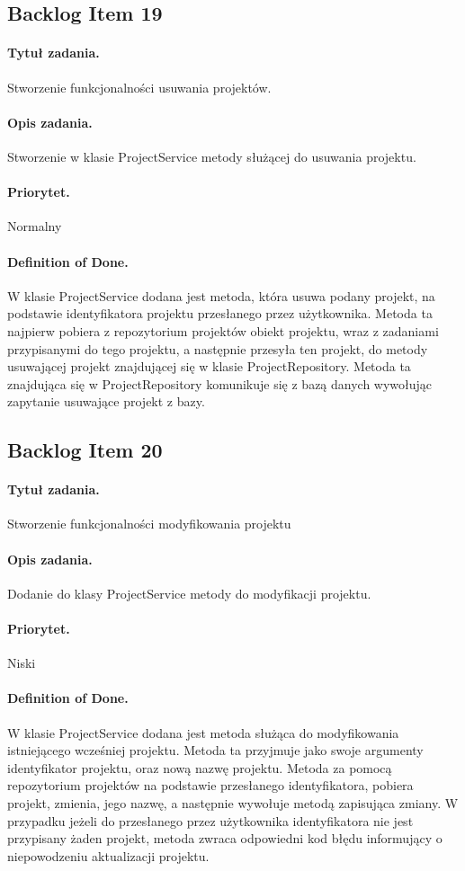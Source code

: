 ﻿\documentclass[a4paper]{article}
\begin{document}
\subsection{Backlog Item 19} 
\paragraph{Tytuł zadania.}  Stworzenie funkcjonalności usuwania projektów.
\paragraph{Opis zadania.} Stworzenie w klasie ProjectService metody służącej do usuwania projektu. 
\paragraph{Priorytet.} Normalny
\paragraph{Definition of Done.} W klasie ProjectService dodana jest metoda, która usuwa podany projekt, na podstawie identyfikatora projektu przesłanego 
przez użytkownika. Metoda ta najpierw pobiera z repozytorium projektów obiekt projektu, wraz z zadaniami przypisanymi do tego projektu, a następnie przesyła ten projekt, do metody usuwającej projekt znajdującej się w klasie ProjectRepository. Metoda ta znajdująca się w ProjectRepository komunikuje się z bazą danych wywołując zapytanie usuwające projekt z bazy. 

\subsection{Backlog Item 20} 
\paragraph{Tytuł zadania.} Stworzenie funkcjonalności modyfikowania projektu
\paragraph{Opis zadania.} Dodanie do klasy ProjectService metody do modyfikacji projektu.
\paragraph{Priorytet.} Niski
\paragraph{Definition of Done.} W klasie ProjectService dodana jest metoda służąca do modyfikowania istniejącego wcześniej projektu. Metoda ta przyjmuje jako swoje argumenty identyfikator projektu, oraz nową nazwę projektu. Metoda za pomocą repozytorium projektów na podstawie przesłanego identyfikatora, pobiera projekt, zmienia, jego nazwę, a następnie wywołuje metodą zapisująca zmiany. W przypadku jeżeli do przesłanego przez użytkownika identyfikatora nie jest przypisany żaden projekt, metoda zwraca odpowiedni kod błędu informujący o niepowodzeniu aktualizacji projektu.
\end{document}
